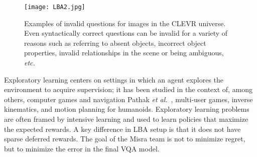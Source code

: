 \documentclass[10pt,twocolumn,letterpaper]{article}
\begin{document}
    \begin{figure}[htbp]
            \centering
            \texttt{[image: LBA2.jpg]}
            \caption{Examples of invalid questions for images in the CLEVR universe. Even syntactically correct questions can be invalid for a variety of reasons such as referring to absent objects, incorrect object properties, invalid relationships in the scene or being ambiguous, \emph{etc.}}
            \label{fig2}
    \end{figure}
    \par
    Exploratory learning centers on settings in which an agent explores the environment to acquire supervision; it has been studied in the context of, among others, computer games and navigation Pathak \emph{et al.}~\cite{[39]}, multi-user games, inverse kinematics, and motion planning for humanoids. Exploratory learning problems are often framed by intensive learning and used to learn policies that maximize the expected rewards. A key difference in LBA setup is that it does not have sparse deferred rewards. The goal of the Misra team is not to minimize regret, but to minimize the error in the final VQA model.
{
\small


}
\end{document}
